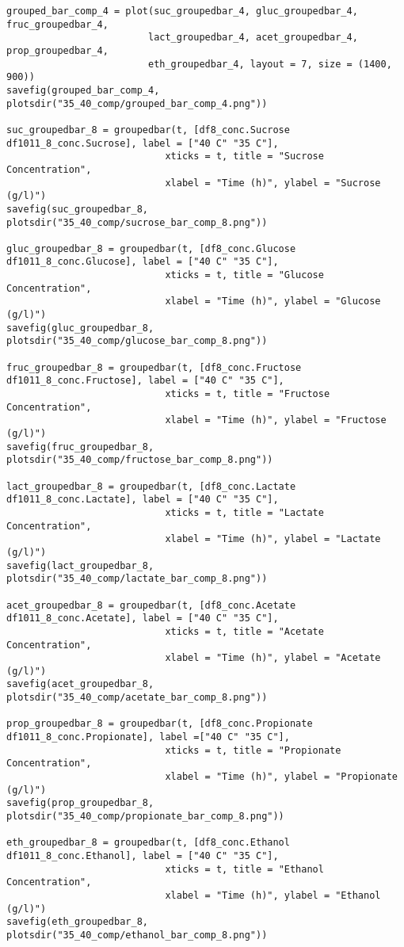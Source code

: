 \documentclass[11pt]{article}
\begin{document}
\begin{verbatim}
grouped_bar_comp_4 = plot(suc_groupedbar_4, gluc_groupedbar_4, fruc_groupedbar_4,
                         lact_groupedbar_4, acet_groupedbar_4, prop_groupedbar_4,
                         eth_groupedbar_4, layout = 7, size = (1400, 900))
savefig(grouped_bar_comp_4, plotsdir("35_40_comp/grouped_bar_comp_4.png"))

suc_groupedbar_8 = groupedbar(t, [df8_conc.Sucrose df1011_8_conc.Sucrose], label = ["40 C" "35 C"],
                            xticks = t, title = "Sucrose Concentration",
                            xlabel = "Time (h)", ylabel = "Sucrose (g/l)")
savefig(suc_groupedbar_8, plotsdir("35_40_comp/sucrose_bar_comp_8.png"))

gluc_groupedbar_8 = groupedbar(t, [df8_conc.Glucose df1011_8_conc.Glucose], label = ["40 C" "35 C"],
                            xticks = t, title = "Glucose Concentration",
                            xlabel = "Time (h)", ylabel = "Glucose (g/l)")
savefig(gluc_groupedbar_8, plotsdir("35_40_comp/glucose_bar_comp_8.png"))

fruc_groupedbar_8 = groupedbar(t, [df8_conc.Fructose df1011_8_conc.Fructose], label = ["40 C" "35 C"],
                            xticks = t, title = "Fructose Concentration",
                            xlabel = "Time (h)", ylabel = "Fructose (g/l)")
savefig(fruc_groupedbar_8, plotsdir("35_40_comp/fructose_bar_comp_8.png"))

lact_groupedbar_8 = groupedbar(t, [df8_conc.Lactate df1011_8_conc.Lactate], label = ["40 C" "35 C"],
                            xticks = t, title = "Lactate Concentration",
                            xlabel = "Time (h)", ylabel = "Lactate (g/l)")
savefig(lact_groupedbar_8, plotsdir("35_40_comp/lactate_bar_comp_8.png"))

acet_groupedbar_8 = groupedbar(t, [df8_conc.Acetate df1011_8_conc.Acetate], label = ["40 C" "35 C"],
                            xticks = t, title = "Acetate Concentration",
                            xlabel = "Time (h)", ylabel = "Acetate (g/l)")
savefig(acet_groupedbar_8, plotsdir("35_40_comp/acetate_bar_comp_8.png"))

prop_groupedbar_8 = groupedbar(t, [df8_conc.Propionate df1011_8_conc.Propionate], label =["40 C" "35 C"],
                            xticks = t, title = "Propionate Concentration",
                            xlabel = "Time (h)", ylabel = "Propionate (g/l)")
savefig(prop_groupedbar_8, plotsdir("35_40_comp/propionate_bar_comp_8.png"))

eth_groupedbar_8 = groupedbar(t, [df8_conc.Ethanol df1011_8_conc.Ethanol], label = ["40 C" "35 C"],
                            xticks = t, title = "Ethanol Concentration",
                            xlabel = "Time (h)", ylabel = "Ethanol (g/l)")
savefig(eth_groupedbar_8, plotsdir("35_40_comp/ethanol_bar_comp_8.png"))


\end{verbatim}
\end{document}
